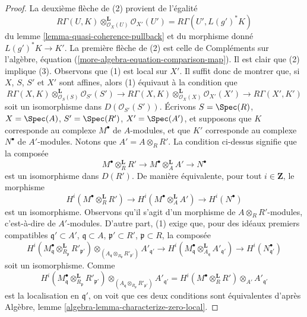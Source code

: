 \begin{proof}
La deuxième flèche de (2) provient de l'égalité
$$
R\Gamma(U, K) \otimes_{\mathcal{O}_X(U)}^\mathbf{L} \mathcal{O}_{X'}(U') =
R\Gamma(U', L(g')^*K)
$$
du lemme \ref{lemma-quasi-coherence-pullback} et du morphisme donné
$L(g')^*K \to K'$. La première flèche de (2) est celle de
Compléments sur l'algèbre, équation (\ref{more-algebra-equation-comparison-map}).
Il est clair que (2) implique (3). Observons que (1) est local sur $X'$.
Il suffit donc de montrer que, si $X$, $S$, $S'$ et $X'$ sont affines, alors
(1) équivaut à la condition que
$$
R\Gamma(X, K) \otimes_{\mathcal{O}_S(S)}^\mathbf{L} \mathcal{O}_{S'}(S')
\to
R\Gamma(X, K) \otimes_{\mathcal{O}_X(X)}^\mathbf{L} \mathcal{O}_{X'}(X')
\to
R\Gamma(X', K')
$$
soit un isomorphisme dans $D(\mathcal{O}_{S'}(S'))$. Écrivons
$S = \Spec(R)$, $X = \Spec(A)$, $S' = \Spec(R')$, $X' = \Spec(A')$,
et supposons que $K$ corresponde au complexe $M^\bullet$ de $A$-modules, et que
$K'$ corresponde au complexe $N^\bullet$ de $A'$-modules.
Notons que $A' = A \otimes_R R'$. La condition ci-dessus signifie que la composée
$$
M^\bullet \otimes_R^\mathbf{L} R' \to
M^\bullet \otimes_A^\mathbf{L} A' \to
N^\bullet
$$
est un isomorphisme dans $D(R')$. De manière équivalente, pour tout
$i \in \mathbf{Z}$, le morphisme
$$
H^i(M^\bullet \otimes_R^\mathbf{L} R') \to
H^i(M^\bullet \otimes_A^\mathbf{L} A') \to
H^i(N^\bullet)
$$
est un isomorphisme. Observons qu'il s'agit d'un morphisme de $A \otimes_R R'$-modules,
c'est-à-dire de $A'$-modules. D'autre part, (1) exige
que, pour des idéaux premiers compatibles
$\mathfrak q' \subset A'$, $\mathfrak q \subset A$,
$\mathfrak p' \subset R'$, $\mathfrak p \subset R$,
la composée
$$
H^i(M^\bullet_\mathfrak q \otimes_{R_\mathfrak p}^\mathbf{L} R'_{\mathfrak p'})
\otimes_{(A_\mathfrak q \otimes_{R_\mathfrak p} R'_{\mathfrak p'})}
A'_{\mathfrak q'} \to
H^i(M^\bullet_{\mathfrak q}
\otimes_{A_\mathfrak q}^\mathbf{L} A'_{\mathfrak q'})
\to H^i(N^\bullet_{\mathfrak q'})
$$
soit un isomorphisme. Comme
$$
H^i(M^\bullet_\mathfrak q \otimes_{R_\mathfrak p}^\mathbf{L} R'_{\mathfrak p'})
\otimes_{(A_\mathfrak q \otimes_{R_\mathfrak p} R'_{\mathfrak p'})}
A'_{\mathfrak q'} =
H^i(M^\bullet \otimes_R^\mathbf{L} R') \otimes_{A'} A'_{\mathfrak q'}
$$
est la localisation en $\mathfrak q'$,
on voit que ces deux conditions sont équivalentes d'après
Algèbre, lemme \ref{algebra-lemma-characterize-zero-local}.
\end{proof}

